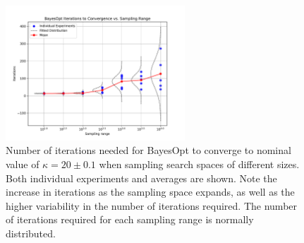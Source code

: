 \documentclass[bsc,frontabs,singlespacing,parskip,deptreport]{infthesis}
\begin{document}
\begin{figure}[h]
    \centering
    \includegraphics[width=0.6\textwidth]{Images/Range/ranges_iters.pdf}
    \caption{Number of iterations needed for BayesOpt to converge to nominal value of $\kappa = 20 \pm 0.1$ when sampling search spaces of different sizes. Both individual experiments and averages are shown. Note the increase in iterations as the sampling space expands, as well as the higher variability in the number of iterations required. The number of iterations required for each sampling range is normally distributed.}
    \label{fig:range_iters}
\end{figure}


\makeatletter
\setlength{\@fptop}{0pt}
\makeatother
\end{document}
